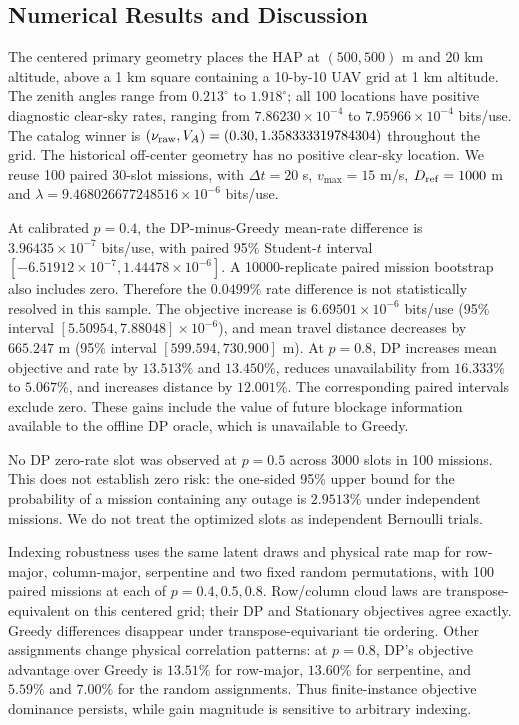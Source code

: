 \subsection{Numerical Results and Discussion}
The centered primary geometry places the HAP at $(500,500)$ m and 20 km
altitude, above a 1 km square containing a 10-by-10 UAV grid at 1 km altitude.
The zenith angles range from $0.213^\circ$ to $1.918^\circ$; all 100 locations
have positive diagnostic clear-sky rates, ranging from $7.86230\times10^{-4}$
to $7.95966\times10^{-4}$ bits/use. The catalog winner is
$(\nu_{\rm raw},V_A)=(0.30,1.358333319784304)$ throughout the grid.
The historical off-center geometry has no positive clear-sky location.
We reuse 100 paired 30-slot missions, with $\Delta t=20$ s,
$v_{\max}=15$ m/s, $D_{\rm ref}=1000$ m and
$\lambda=9.468026677248516\times10^{-6}$ bits/use.

At calibrated $p=0.4$, the DP-minus-Greedy mean-rate difference is
$3.96435\times10^{-7}$ bits/use, with paired 95\% Student-$t$ interval
$[-6.51912\times10^{-7},1.44478\times10^{-6}]$.
A 10000-replicate paired mission bootstrap also includes zero. Therefore
the $0.0499\%$ rate difference is not statistically resolved in this sample.
The objective increase is $6.69501\times10^{-6}$ bits/use
(95\% interval $[5.50954,7.88048]\times10^{-6}$), and mean travel distance
decreases by $665.247$ m (95\% interval $[599.594,730.900]$ m).
At $p=0.8$, DP increases mean objective and rate by $13.513\%$ and $13.450\%$,
reduces unavailability from $16.333\%$ to $5.067\%$, and increases distance
by $12.001\%$. The corresponding paired intervals exclude zero.
These gains include the value of future blockage information available
to the offline DP oracle, which is unavailable to Greedy.

No DP zero-rate slot was observed at $p=0.5$ across 3000 slots in 100 missions.
This does not establish zero risk: the one-sided 95\% upper bound for the
probability of a mission containing any outage is $2.9513\%$ under independent
missions. We do not treat the optimized slots as independent Bernoulli trials.

Indexing robustness uses the same latent draws and physical rate map for
row-major, column-major, serpentine and two fixed random permutations,
with 100 paired missions at each of $p=0.4,0.5,0.8$.
Row/column cloud laws are transpose-equivalent on this centered grid;
their DP and Stationary objectives agree exactly. Greedy differences
disappear under transpose-equivariant tie ordering. Other assignments
change physical correlation patterns: at $p=0.8$, DP's objective advantage
over Greedy is $13.51\%$ for row-major, $13.60\%$ for serpentine, and $5.59\%$
and $7.00\%$ for the random assignments. Thus finite-instance objective
dominance persists, while gain magnitude is sensitive to arbitrary indexing.
